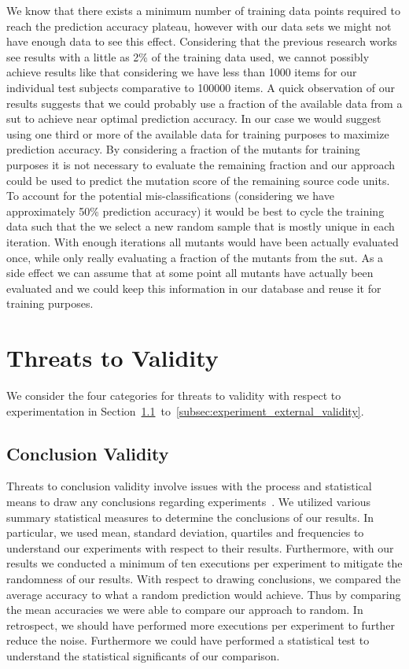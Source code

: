 We know that there exists a minimum number of training data points required to reach the prediction accuracy plateau, however with our data sets we might not have enough data to see this effect. Considering that the previous research works see results with a little as 2\% of the training data used, we cannot possibly achieve results like that considering we have less than 1000 items for our individual test subjects comparative to 100000 items. A quick observation of our results suggests that we could probably use a fraction of the available data from a \gls{sut} to achieve near optimal prediction accuracy. In our case we would suggest using one third or more of the available data for training purposes to maximize prediction accuracy. By considering a fraction of the mutants for training purposes it is not necessary to evaluate the remaining fraction and our approach could be used to predict the mutation score of the remaining source code units. To account for the potential mis-classifications (considering we have approximately 50\% prediction accuracy) it would be best to cycle the training data such that the we select a new random sample that is mostly unique in each iteration. With enough iterations all mutants would have been actually evaluated once, while only really evaluating a fraction of the mutants from the \gls{sut}. As a side effect we can assume that at some point all mutants have actually been evaluated and we could keep this information in our database and reuse it for training purposes.


\section{Threats to Validity}
\label{sec:experiment_threats}
We consider the four categories for threats to validity with respect to experimentation in Section~\ref{subsec:experiment_conclusion_validity}~to~\ref{subsec:experiment_external_validity}.


\subsection{Conclusion Validity}
\label{subsec:experiment_conclusion_validity}
Threats to conclusion validity involve issues with the process and statistical means to draw any conclusions regarding experiments~\cite{WRH+00,WKP10}. We utilized various summary statistical measures to determine the conclusions of our results. In particular, we used mean, standard deviation, quartiles and frequencies to understand our experiments with respect to their results. Furthermore, with our results we conducted a minimum of ten executions per experiment to mitigate the randomness of our results. With respect to drawing conclusions, we compared the average accuracy to what a random prediction would achieve. Thus by comparing the mean accuracies we were able to compare our approach to random. In retrospect, we should have performed more executions per experiment to further reduce the noise. Furthermore we could have performed a statistical test to understand the statistical significants of our comparison.


